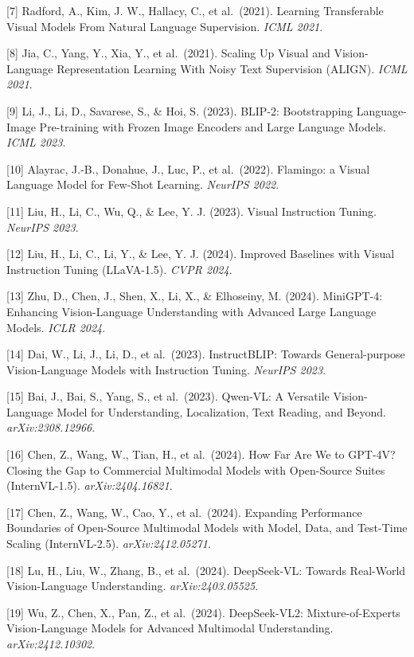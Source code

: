 {[}7{]} Radford, A., Kim, J. W., Hallacy, C., et al.~(2021). Learning Transferable Visual Models From Natural Language Supervision. \emph{ICML 2021}.

{[}8{]} Jia, C., Yang, Y., Xia, Y., et al.~(2021). Scaling Up Visual and Vision-Language Representation Learning With Noisy Text Supervision (ALIGN). \emph{ICML 2021}.

{[}9{]} Li, J., Li, D., Savarese, S., \& Hoi, S. (2023). BLIP-2: Bootstrapping Language-Image Pre-training with Frozen Image Encoders and Large Language Models. \emph{ICML 2023}.

{[}10{]} Alayrac, J.-B., Donahue, J., Luc, P., et al.~(2022). Flamingo: a Visual Language Model for Few-Shot Learning. \emph{NeurIPS 2022}.

{[}11{]} Liu, H., Li, C., Wu, Q., \& Lee, Y. J. (2023). Visual Instruction Tuning. \emph{NeurIPS 2023}.

{[}12{]} Liu, H., Li, C., Li, Y., \& Lee, Y. J. (2024). Improved Baselines with Visual Instruction Tuning (LLaVA-1.5). \emph{CVPR 2024}.

{[}13{]} Zhu, D., Chen, J., Shen, X., Li, X., \& Elhoseiny, M. (2024). MiniGPT-4: Enhancing Vision-Language Understanding with Advanced Large Language Models. \emph{ICLR 2024}.

{[}14{]} Dai, W., Li, J., Li, D., et al.~(2023). InstructBLIP: Towards General-purpose Vision-Language Models with Instruction Tuning. \emph{NeurIPS 2023}.

{[}15{]} Bai, J., Bai, S., Yang, S., et al.~(2023). Qwen-VL: A Versatile Vision-Language Model for Understanding, Localization, Text Reading, and Beyond. \emph{arXiv:2308.12966}.

{[}16{]} Chen, Z., Wang, W., Tian, H., et al.~(2024). How Far Are We to GPT-4V? Closing the Gap to Commercial Multimodal Models with Open-Source Suites (InternVL-1.5). \emph{arXiv:2404.16821}.

{[}17{]} Chen, Z., Wang, W., Cao, Y., et al.~(2024). Expanding Performance Boundaries of Open-Source Multimodal Models with Model, Data, and Test-Time Scaling (InternVL-2.5). \emph{arXiv:2412.05271}.

{[}18{]} Lu, H., Liu, W., Zhang, B., et al.~(2024). DeepSeek-VL: Towards Real-World Vision-Language Understanding. \emph{arXiv:2403.05525}.

{[}19{]} Wu, Z., Chen, X., Pan, Z., et al.~(2024). DeepSeek-VL2: Mixture-of-Experts Vision-Language Models for Advanced Multimodal Understanding. \emph{arXiv:2412.10302}.

